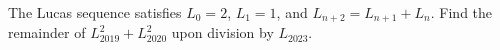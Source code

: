 The Lucas sequence satisfies $L_0=2$, $L_1=1$, and $L_{n+2}=L_{n+1}+L_n$. Find the remainder of $L_{2019}^2+L_{2020}^2$ upon division by $L_{2023}$.
